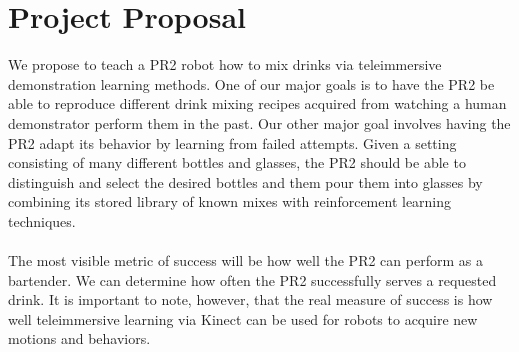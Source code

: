 \documentclass{sig-alternate}
\begin{document}
\section{Project Proposal}
\label{sec:project_proposal}We propose to teach a PR2 robot how to mix drinks via
teleimmersive demonstration learning methods. One of our major goals is to have the PR2
be able to reproduce different drink mixing recipes acquired from watching
a human demonstrator perform them in the past.
Our other major goal involves having the PR2 adapt its behavior by learning from failed attempts.
Given a setting consisting of many different bottles and glasses, the PR2 should be able to 
distinguish and select the desired bottles and them pour them into glasses by
combining its stored library of known mixes with reinforcement learning techniques.
\\
\\The most visible metric of success will be  how well the PR2
can perform as a bartender. We can determine how often the PR2
successfully serves a requested drink. It is important to note, however, that the real
measure of success is how well teleimmersive learning via Kinect can be used
for robots to acquire new motions and behaviors.
\end{document}
